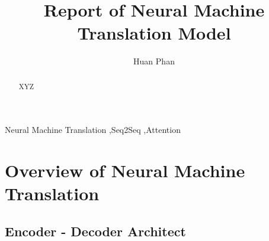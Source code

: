 \documentclass[preprint,12pt]{elsarticle}
\begin{document}
\begin{frontmatter}



\title{Report of Neural Machine Translation Model}


\author{Huan Phan}

\address{VietAI Course 3's student, HCM, Vietnam}

\begin{abstract}
XYZ
\end{abstract}

\begin{keyword}
Neural Machine Translation \sep Seq2Seq \sep Attention


\end{keyword}

\end{frontmatter}

\linenumbers

\section{Overview of Neural Machine Translation}
\label{S:1}

\subsection{Encoder - Decoder Architect}
\end{document}
